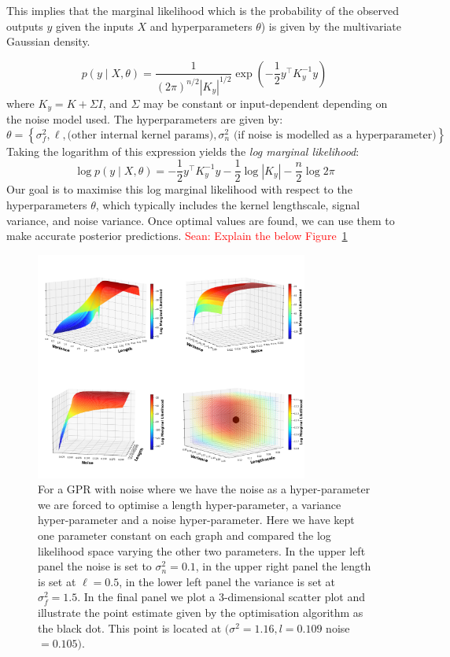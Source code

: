 \documentclass[10pt]{article}
\newcommand{\Sean}[1]{{\textcolor{red}{{Sean: #1}} }}
\begin{document}
\noindent
This implies that the marginal likelihood which is the probability of the observed outputs \( y \) given the inputs \( X \) and hyperparameters \( \theta \)) is given by the multivariate Gaussian density. 

\[
p(y \mid X, \theta) = \frac{1}{(2\pi)^{n/2} |K_y|^{1/2}} \exp\left( -\frac{1}{2} y^\top K_y^{-1} y \right)
\]
where \( K_y = K + \Sigma I \), and \( \Sigma \) may be constant or input-dependent depending on the noise model used.
\noindent
The hyperparameters are given by:
\[
\theta = \left\{ \sigma_f^2, \ell, \text{(other internal kernel params)}, \sigma_n^2 \,\, \text{(if noise is modelled as a hyperparameter)} \right\}.
\]
\noindent
Taking the logarithm of this expression yields the \textit{log marginal likelihood}:
\begin{equation}\label{eq: 5}
\log p(y \mid X, \theta) = -\frac{1}{2} y^\top K_y^{-1} y - \frac{1}{2} \log |K_y| - \frac{n}{2} \log 2\pi
\end{equation}
\noindent
Our goal is to maximise this log marginal likelihood with respect to the hyperparameters \( \theta \), which typically includes the kernel lengthscale, signal variance, and noise variance. Once optimal values are found, we can use them to make accurate posterior predictions.
\Sean{Explain the below Figure~\ref{figure: Optimising Hyper-params}}
\begin{figure}[H]
    \centering
    \includegraphics[width=0.8\textwidth]{LatexPlots/1dplots/LogLikeallparams.png}
    \caption{For a GPR with noise where we have the noise as a hyper-parameter we are forced to optimise a length hyper-parameter, a variance hyper-parameter and a noise hyper-parameter. 
    Here we have kept one parameter constant on each graph and compared the log likelihood space varying the other two parameters. 
    In the upper left panel the noise is set to $\sigma^2_n= 0.1$, in the upper right panel the length is set at $ \ell=0.5$, in the lower left panel the variance is set at $\sigma^2_f=1.5$. 
    In the final panel we plot a 3-dimensional scatter plot and illustrate the point estimate given by the optimisation algorithm as the black dot. This point is located at
    $(\sigma^2 = 1.16, l = 0.109$ noise$ = 0.105)$.}
   \label{figure: Optimising Hyper-params}
\end{figure} 
\end{document}
